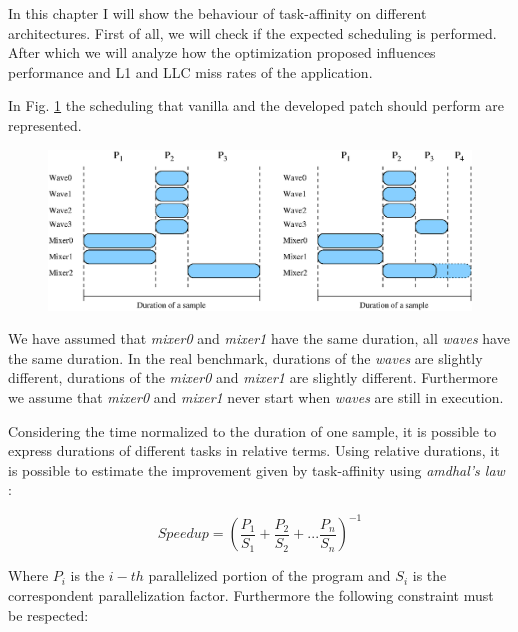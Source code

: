 In this chapter I will show the behaviour of task-affinity on different architectures. First of all, we will check if the expected scheduling is performed. 
After which we will analyze how the optimization proposed influences performance and L1 and LLC miss rates of the application. 

In Fig. \ref{fig:ideal_scheduling} the scheduling that vanilla and the developed patch should perform are represented.

\begin{figure}[htbp]
\centering
\includegraphics[width=\widefigure]{images/schedule_van_taskaff.eps}
\caption{}
\label{fig:ideal_scheduling}
\end{figure}

We have assumed that \textit{mixer0} and \textit{mixer1} have the same duration, all \textit{waves} have the same duration.
In the real benchmark, durations of the \textit{waves} are slightly different, durations of the \textit{mixer0} and 
\textit{mixer1} are slightly different. Furthermore we assume that \textit{mixer0} and \textit{mixer1} never start when \textit{waves} are still in 
execution.

Considering the time normalized to the duration of one sample, it is possible to express durations of different tasks in relative terms.
Using relative durations, it is possible to estimate the improvement given by task-affinity using \textit{amdhal's law} \cite{lcs}:

\begin{equation}
       Speedup = \left(\frac{P_{1}}{S_{1}} + \frac{P_{2}}{S_{2}} + ... \frac{P_{n}}{S_{n}} \right)^{-1} 
\label{eq:amdhal}
\end{equation}

Where $P_{i}$ is the $i-th$ parallelized portion of the program and $S_{i}$ is the correspondent parallelization factor. Furthermore the following 
constraint must be respected:

